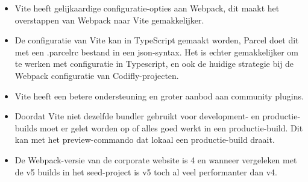 \begin{itemize}
    \item Vite heeft gelijkaardige configuratie-opties aan Webpack, dit maakt het overstappen van Webpack naar Vite gemakkelijker.
    \item De configuratie van Vite kan in TypeScript gemaakt worden, Parcel doet dit met een .parcelrc bestand in een json-syntax. Het is echter gemakkelijker om te werken met configuratie in Typescript, en ook de huidige strategie bij de Webpack configuratie van Codifly-projecten.
    \item Vite heeft een betere ondersteuning en groter aanbod aan community plugins.
    \item Doordat Vite niet dezelfde bundler gebruikt voor development- en productie-builds moet er gelet worden op of alles goed werkt in een productie-build. Dit kan met het preview-commando dat lokaal een productie-build draait.
    \item De Webpack-versie van de corporate website is 4 en wanneer vergeleken met de v5 builds in het seed-project is v5 toch al veel performanter dan v4.
\end{itemize}
